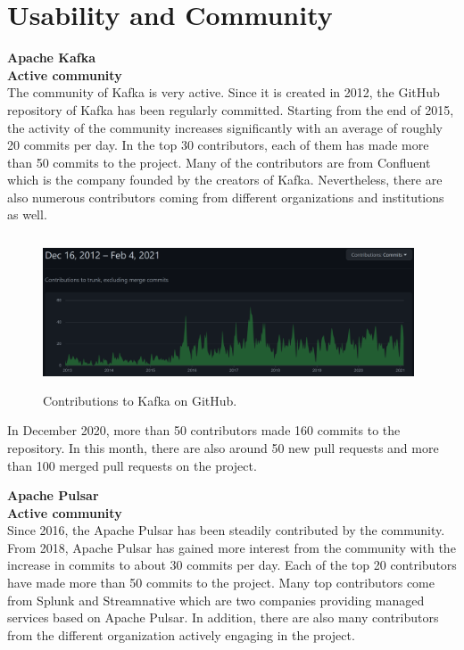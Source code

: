 \section{Usability and Community} \label{section:usability}
\large \textbf{Apache Kafka}\\
\normalsize
\textbf{Active community}\\
The community of Kafka is very active. Since it is created in 2012, the GitHub repository of Kafka has been regularly committed. Starting from the end of 2015, the activity of the community increases significantly with an average of roughly 20 commits per day. In the top 30 contributors, each of them has made more than 50 commits to the project. Many of the contributors are from Confluent which is the company founded by the creators of Kafka. Nevertheless, there are also numerous contributors coming from different organizations and institutions as well.

\begin{figure}[h]
	\centering
	\includegraphics[width=11cm,height=4.5cm]{images/community-kafka.png}
	\caption{Contributions to Kafka on GitHub.}
	\label{fig:communitykafka}
\end{figure}

In December 2020, more than 50 contributors made 160 commits to the repository. In this month, there are also around 50 new pull requests and more than 100 merged pull requests on the project.

\large \textbf{Apache Pulsar}\\
\normalsize
\textbf{Active community}\\
Since 2016, the Apache Pulsar has been steadily contributed by the community. From 2018, Apache Pulsar has gained more interest from the community with the increase in commits to about 30 commits per day. Each of the top 20 contributors have made more than 50 commits to the project. Many top contributors come from Splunk and Streamnative which are two companies providing managed services based on Apache Pulsar. In addition, there are also many contributors from the different organization actively engaging in the project.

